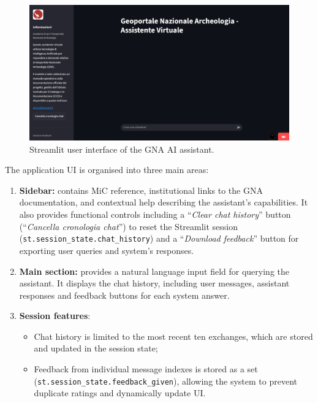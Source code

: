 \begin{spacing}{1.5}
\vspace{0.8em}
\begin{figure}[H]
  \centering
  \includegraphics[width=\textwidth]{images/UI_full.png} 
  \caption{Streamlit user interface of the GNA AI assistant.}
  \label{fig:UI}
\end{figure}

\noindent The application UI is organised into three main areas:
\begin{enumerate}
      \item \textbf{Sidebar:} contains MiC reference, institutional links to the GNA documentation, and contextual help describing the assistant’s capabilities. It also provides functional controls including a ``\textit{Clear chat history}'' button (``\textit{Cancella cronologia chat}'') to reset the Streamlit session (\texttt{st.session\_state.chat\_history}) and a ``\textit{Download feedback}'' button for exporting user queries and system's responses.
      \item \textbf{Main section:} provides a natural language input field for querying the assistant. It displays the chat history, including user messages, assistant responses and feedback buttons for each system answer.
      \item \textbf{Session features}: 
      \begin{itemize}
            \item Chat history is limited to the most recent ten exchanges, which are stored and updated in the session state;
            \item Feedback from individual message indexes is stored as a set (\texttt{st.session\_state.feedback\_given}), allowing the system to prevent duplicate ratings and dynamically update UI.
      \end{itemize}
\end{enumerate}


\end{spacing}

